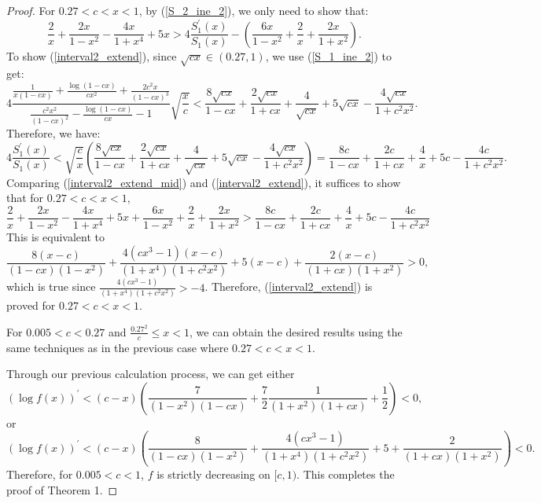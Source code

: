 ﻿\documentclass[10pt]{article}
\begin{document}
\begin{proof}
For $0.27<c<x<1$, by (\ref{S_2_ine_2}), we only need to show that:
\begin{equation}
    \frac{2}{x}+\frac{2x}{1-x^2}-\frac{4x}{1+x^4}+5x>4\frac{S_1^{'}(x)}{S_1(x)}-\left(\frac{6x}{1-x^2}+\frac{2}{x}+\frac{2x}{1+x^2}\right). \label{interval2_extend}
\end{equation}
To show (\ref{interval2_extend}), since $\sqrt{cx}\in(0.27, 1)$, we use (\ref{S_1_ine_2}) to get:
\begin{equation}
        4\frac{\frac{1}{x(1-cx)}+\frac{\log(1-cx)}{cx^2}+\frac{2c^2x}{(1-cx)^3}}{\frac{c^2x^2}{(1-cx)^{2}}-\frac{\log(1-cx)}{cx}-1}\sqrt{\frac{x}{c}}<\frac{8\sqrt{cx}}{1-cx}+\frac{2\sqrt{cx}}{1+cx}+\frac{4}{\sqrt{cx}}+5\sqrt{cx}-\frac{4\sqrt{cx}}{1+c^2x^2}.
\end{equation}
Therefore, we have:
\begin{equation}
    4\frac{S_1^{'}(x)}{S_1(x)}<\sqrt{\frac{c}{x}}\left(\frac{8\sqrt{cx}}{1-cx}+\frac{2\sqrt{cx}}{1+cx}+\frac{4}{\sqrt{cx}}+5\sqrt{cx}-\frac{4\sqrt{cx}}{1+c^2x^2}\right) = \frac{8c}{1-cx}+\frac{2c}{1+cx}+\frac{4}{x}+5c-\frac{4c}{1+c^2x^2}.
\label{interval2_extend_mid}
\end{equation}
Comparing (\ref{interval2_extend_mid}) and (\ref{interval2_extend}),
it suffices to show that for $0.27<c<x<1$,
$$\frac{2}{x}+\frac{2x}{1-x^2}-\frac{4x}{1+x^4}+5x+\frac{6x}{1-x^2}+\frac{2}{x}+\frac{2x}{1+x^2}>\frac{8c}{1-cx}+\frac{2c}{1+cx}+\frac{4}{x}+5c-\frac{4c}{1+c^2x^2}
$$
This is equivalent to
$$\frac{8(x-c)}{(1-cx)(1-x^2)}+\frac{4(cx^3-1)(x-c)}{(1+x^4)(1+c^2x^2)}+5(x-c)+\frac{2(x-c)}{(1+cx)(1+x^2)}>0,
$$
which is true since $\frac{4(cx^3-1)}{(1+x^4)(1+c^2x^2)}>-4$. Therefore, (\ref{interval2_extend}) is proved for $0.27<c<x<1$.

For $0.005<c<0.27$ and $\frac{0.27^2}{c}\leq x<1$, we can obtain the desired results using the same techniques as in the previous case where $0.27<c<x<1$.

Through our previous calculation process, we can get either
$$(\log f(x))^{'} <(c-x)\left(\frac{7}{(1-x^2)(1-cx)}+\frac{7}{2}\frac{1}{(1+x^2)(1+cx)}+\frac{1}{2}\right)<0,
$$
or
$$(\log f(x))^{'} <(c-x)\left(\frac{8}{(1-cx)(1-x^2)}+\frac{4(cx^3-1)}{(1+x^4)(1+c^2x^2)}+5+\frac{2}{(1+cx)(1+x^2)}\right)<0.
$$
Therefore, for $0.005<c<1$, $f$ is strictly decreasing on $[c,1)$.
This completes the proof of Theorem 1.

\end{proof}
\end{document}
